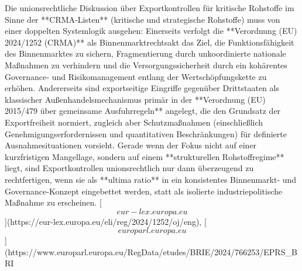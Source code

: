 \documentclass[12pt,a4paper,oneside]{book} %
\begin{document}
Die unionsrechtliche Diskussion über Exportkontrollen für kritische Rohstoffe im Sinne der **CRMA‑Listen** (kritische und strategische Rohstoffe) muss von einer doppelten Systemlogik ausgehen: Einerseits verfolgt die **Verordnung (EU) 2024/1252 (CRMA)** als Binnenmarktrechtsakt das Ziel, die Funktionsfähigkeit des Binnenmarktes zu sichern, Fragmentierung durch unkoordinierte nationale Maßnahmen zu verhindern und die Versorgungssicherheit durch ein kohärentes Governance‑ und Risikomanagement entlang der Wertschöpfungskette zu erhöhen.  Andererseits sind exportseitige Eingriffe gegenüber Drittstaaten als klassischer Außenhandelsmechanismus primär in der **Verordnung (EU) 2015/479 über gemeinsame Ausfuhrregeln** angelegt, die den Grundsatz der Exportfreiheit normiert, zugleich aber Schutzmaßnahmen (einschließlich Genehmigungserfordernissen und quantitativen Beschränkungen) für definierte Ausnahmesituationen vorsieht.  Gerade wenn der Fokus nicht auf einer kurzfristigen Mangellage, sondern auf einem **strukturellen Rohstoffregime** liegt, sind Exportkontrollen unionsrechtlich nur dann überzeugend zu rechtfertigen, wenn sie als **ultima ratio** in ein konsistentes Binnenmarkt‑ und Governance‑Konzept eingebettet werden, statt als isolierte industriepolitische Maßnahme zu erscheinen. [\[eur-lex.europa.eu\]](https://eur-lex.europa.eu/eli/reg/2024/1252/oj/eng), [\[europarl.europa.eu\]](https://www.europarl.europa.eu/RegData/etudes/BRIE/2024/766253/EPRS_BRI%
\end{document}
